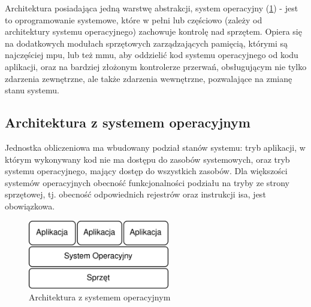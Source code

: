 \documentclass[../../main]{subfiles}
\begin{document}
Architektura posiadająca jedną warstwę abstrakcji, system operacyjny (\cref{fig:no-virt}) - jest to oprogramowanie systemowe, które w pełni lub częściowo (zależy od architektury systemu operacyjnego) zachowuje kontrolę nad sprzętem. Opiera się na dodatkowych modułach sprzętowych zarządzających pamięcią, którymi są najczęściej \gls{mpu}, lub też \gls{mmu}, aby oddzielić kod systemu operacyjnego od kodu aplikacji, oraz na bardziej złożonym kontrolerze przerwań, obsługującym nie tylko zdarzenia zewnętrzne, ale także zdarzenia wewnętrzne, pozwalające na zmianę stanu systemu.

\subsection{Architektura z systemem operacyjnym}

Jednostka obliczeniowa ma wbudowany podział stanów systemu: tryb aplikacji, w którym wykonywany kod nie ma dostępu do zasobów systemowych, oraz tryb systemu operacyjnego, mający dostęp do wszystkich zasobów. Dla większości systemów operacyjnych obecność funkcjonalności podziału na tryby ze strony sprzętowej, tj. obecność odpowiednich rejestrów oraz instrukcji \gls{isa}, jest obowiązkowa.

\begin{figure}[ht]
    \centering
    \includegraphics[width=0.55\textwidth]{Images/no-virt.png}
    \caption{Architektura z systemem operacyjnym}
    \label{fig:no-virt}
\end{figure}
\end{document}
